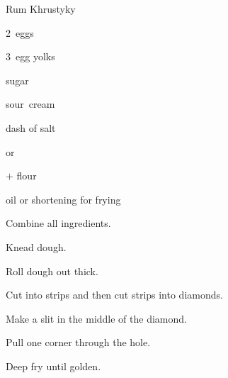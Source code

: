\begin{recipe}{Rum Khrustyky}{}{}

\begin{ingredients}
\item 2~eggs
\item 3~egg yolks
\item {} sugar
\item {} sour~cream
\item dash of salt
\item {}  or 
\item {}$+$ flour
\item oil or shortening for frying
\end{ingredients}

\begin{directions}
\item Combine all ingredients.
\item Knead dough.
\item Roll dough out \inch{\eighth} thick.
\item Cut into strips and then cut strips into diamonds.
\item Make a slit in the middle of the diamond.
\item Pull one corner through the hole.
\item Deep fry until golden.
\end{directions}

\end{recipe}
